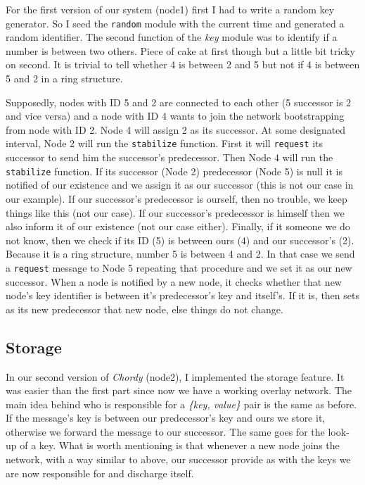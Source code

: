 \documentclass[a4paper, 10pt]{article}
\begin{document}
For the first version of our system (node1) first I had to write a random key
generator. So I seed the \texttt{random} module with the current time and
generated a random identifier. The second function of the \emph{key} module was
to identify if a number is between two others. Piece of cake at first though but
a little bit tricky on second. It is trivial to tell whether 4 is between 2 and
5 but not if 4 is between 5 and 2 in a ring structure.

Supposedly, nodes
with ID 5 and 2 are connected to each other (5 successor is 2 and vice versa)
and a node with ID 4 wants to join the network bootstrapping from node with ID 2.
Node 4 will assign 2 as its successor. At some designated interval, Node 2 will
run the \texttt{stabilize} function. First it will \texttt{request} its
successor to send him the successor's predecessor. Then Node 4 will run the
\texttt{stabilize} function. If its successor (Node 2) predecessor (Node 5) is
null it is notified of our existence and we assign it as our successor (this is
not our case in our example). If our successor's predecessor is ourself, then no
trouble, we keep things like this (not our case). If our successor's predecessor
is himself then we also inform it of our existence (not our case either).
Finally, if it someone we do not know, then we check if its ID (5) is between
ours (4) and our successor's (2). Because it is a ring structure, number 5 is
between 4 and 2. In that case we send a \texttt{request} message to Node 5
repeating that procedure and we set it as our new successor. When a node is
notified by a new node, it checks whether that new node's key identifier is
between it's predecessor's key and itself's. If it is, then sets as its new
predecessor that new node, else things do not change.

\subsection{Storage}

In our second version of \emph{Chordy} (node2), I implemented the storage
feature. It was easier than the first part since now we have a working overlay
network. The main idea behind who is responsible for a \emph{\{key, value\}} pair is
the same as before. If the message's key is between our predecessor's key and
ours we store it, otherwise we forward the message to our successor. The same
goes for the look-up of a key. What is worth mentioning is that whenever a
new node joins the network, with a way similar to above, our successor provide
as with the keys we are now responsible for and discharge itself.
\end{document}
